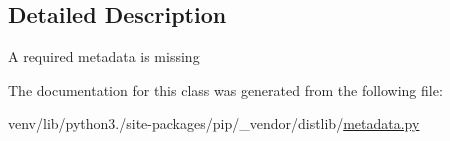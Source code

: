 \subsection{Detailed Description}
\begin{DoxyVerb}A required metadata is missing\end{DoxyVerb}
 

The documentation for this class was generated from the following file\+:\begin{DoxyCompactItemize}
\item 
venv/lib/python3./site-\/packages/pip/\+\_\+vendor/distlib/\hyperlink{pip_2__vendor_2distlib_2metadata_8py}{metadata.\+py}\end{DoxyCompactItemize}
